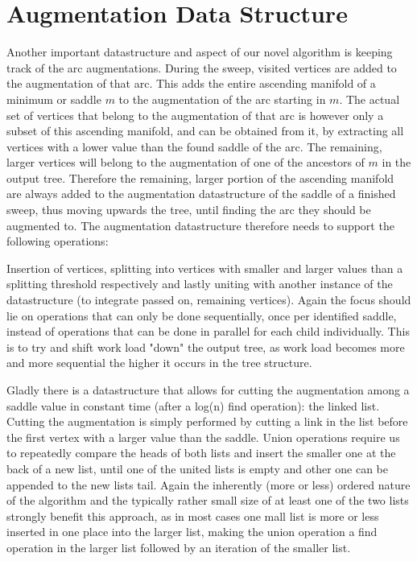 \documentclass[%
	paper=A4,					%
	twoside=true,				%
	openright,					%
	parskip=full,				%
	chapterprefix=true,			%
	11pt,						%
	headings=normal,			%
	bibliography=totoc,			%
	listof=totoc,				%
	titlepage=on,				%
	captions=tableabove,		%
	draft=false,				%
]{scrreprt}%
\begin{document}
\section{Augmentation Data Structure}
Another important datastructure and aspect of our novel algorithm is keeping track of the arc augmentations. During the sweep, visited vertices are added to the augmentation of that arc. This adds the entire ascending manifold of a minimum or saddle \(m\) to the augmentation of the arc starting in \(m\). The actual set of vertices that belong to the augmentation of that arc is however only a subset of this ascending manifold, and can be obtained from it, by extracting all vertices with a lower value than the found saddle of the arc. The remaining, larger vertices will belong to the augmentation of one of the ancestors of \(m\) in the output tree. Therefore the remaining, larger portion of the ascending manifold are always added to the augmentation datastructure of the saddle of a finished sweep, thus moving upwards the tree, until finding the arc they should be augmented to. The augmentation datastructure therefore needs to support the following operations:

Insertion of vertices, splitting into vertices with smaller and larger values than a splitting threshold respectively and lastly uniting with another instance of the datastructure (to integrate passed on, remaining vertices). Again the focus should lie on operations that can only be done sequentially, once per identified saddle, instead of operations that can be done in parallel for each child individually. This is to try and shift work load "down" the output tree, as work load becomes more and more sequential the higher it occurs in the tree structure.

Gladly there is a datastructure that allows for cutting the augmentation among a saddle value in constant time (after a log(n) find operation): the linked list. Cutting the augmentation is simply performed by cutting a link in the list before the first vertex with a larger value than the saddle. Union operations require us to repeatedly compare the heads of both lists and insert the smaller one at the back of a new list, until one of the united lists is empty and other one can be appended to the new lists tail. Again the inherently (more or less) ordered nature of the algorithm and the typically rather small size of at least one of the two lists strongly benefit this approach, as in most cases one mall list is more or less inserted in one place into the larger list, making the union operation a find operation in the larger list followed by an iteration of the smaller list.
\end{document}
